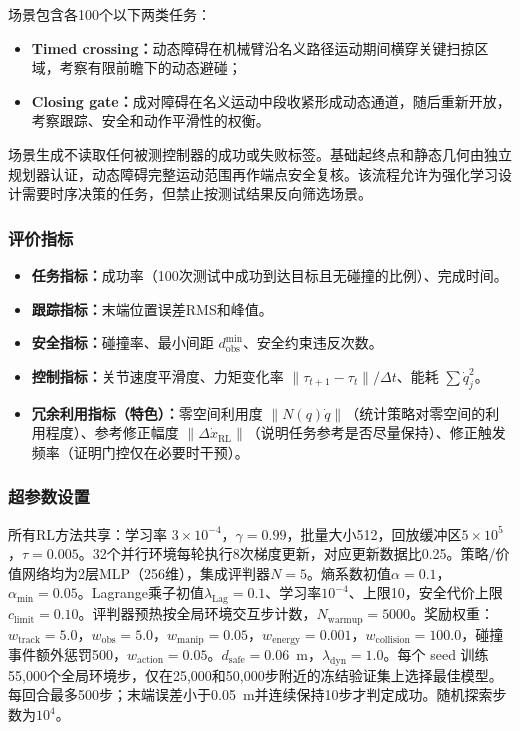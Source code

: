 \documentclass[10pt,conference]{IEEEtran}
\begin{document}
场景包含各100个以下两类任务：
\begin{itemize}
\item \textbf{Timed crossing：}动态障碍在机械臂沿名义路径运动期间横穿关键扫掠区域，考察有限前瞻下的动态避碰；
\item \textbf{Closing gate：}成对障碍在名义运动中段收紧形成动态通道，随后重新开放，考察跟踪、安全和动作平滑性的权衡。
\end{itemize}

场景生成不读取任何被测控制器的成功或失败标签。基础起终点和静态几何由独立规划器认证，动态障碍完整运动范围再作端点安全复核。该流程允许为强化学习设计需要时序决策的任务，但禁止按测试结果反向筛选场景。

\subsubsection{评价指标}
\begin{itemize}
\item \textbf{任务指标：}成功率（100次测试中成功到达目标且无碰撞的比例）、完成时间。
\item \textbf{跟踪指标：}末端位置误差RMS和峰值。
\item \textbf{安全指标：}碰撞率、最小间距 $d_{\text{obs}}^{\min}$、安全约束违反次数。
\item \textbf{控制指标：}关节速度平滑度、力矩变化率 $\|\tau_{t+1}-\tau_t\|/\Delta t$、能耗 $\sum\dot{q}_j^2$。
\item \textbf{冗余利用指标（特色）：}零空间利用度 $\|N(q)\dot{q}\|$（统计策略对零空间的利用程度）、参考修正幅度 $\|\Delta\dot{x}_{\text{RL}}\|$（说明任务参考是否尽量保持）、修正触发频率（证明门控仅在必要时干预）。
\end{itemize}

\subsubsection{超参数设置}
所有RL方法共享：学习率 $3\times10^{-4}$，$\gamma=0.99$，批量大小512，回放缓冲区$5\times10^5$，$\tau=0.005$。32个并行环境每轮执行8次梯度更新，对应更新数据比0.25。策略/价值网络均为2层MLP（256维），集成评判器$N=5$。熵系数初值$\alpha=0.1$，$\alpha_{\min}=0.05$。Lagrange乘子初值$\lambda_{\text{Lag}}=0.1$、学习率$10^{-4}$、上限10，安全代价上限$c_{\text{limit}}=0.10$。评判器预热按全局环境交互步计数，$N_{\text{warmup}}=5000$。奖励权重：$w_{\text{track}}=5.0$，$w_{\text{obs}}=5.0$，$w_{\text{manip}}=0.05$，$w_{\text{energy}}=0.001$，$w_{\text{collision}}=100.0$，碰撞事件额外惩罚500，$w_{\text{action}}=0.05$。$d_{\text{safe}}=0.06$~m，$\lambda_{\text{dyn}}=1.0$。每个 seed 训练55,000个全局环境步，仅在25,000和50,000步附近的冻结验证集上选择最佳模型。每回合最多500步；末端误差小于0.05~m并连续保持10步才判定成功。随机探索步数为$10^4$。
\end{document}
